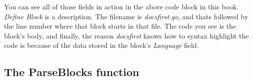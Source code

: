 \documentclass{article}
\begin{document}
You can see all of those fields in action in the above code block in this book.
\emph{Define Block} is a description. The filename is \emph{docsfirst.go}, and
thats followed by the line number where that block starts in that file. The code
you see is the block's body, and finally, the reason \emph{docsfirst} knows how
to syntax highlight the code is because of the data stored in the block's
\emph{Language} field.

\subsection{The ParseBlocks function}









\end{document}
